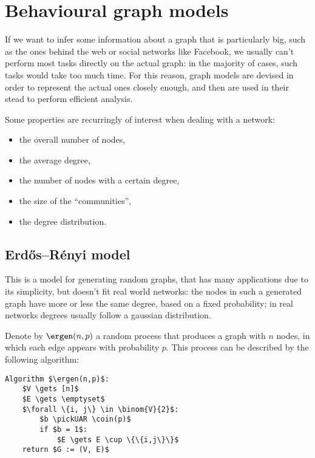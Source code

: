 \chapter{Behavioural graph models}\label{sec:users-behaviors}

If we want to infer some information about a graph that is particularly big, such as the ones behind the web or social networks like Facebook, we usually can't perform most tasks directly on the actual graph: in the majority of cases, such tasks would take too much time. For this reason, graph models are devised in order to represent the actual ones closely enough, and then are used in their stead to perform efficient analysis.

Some properties are recurringly of interest when dealing with a network:
\begin{itemize}
    \item the overall number of nodes,
    \item the average degree,
    \item the number of nodes with a certain degree,
    \item the size of the ``communities'',
    \item the degree distribution.
\end{itemize}

\section{Erd\H{o}s–Rényi model}\label{sec:gnp}
    
This is a model for generating random graphs, that has many applications due to its simplicity, but doesn't fit real world networks: the nodes in such a generated graph have more or less the same degree, based on a fixed probability; in real networks degrees usually follow a gaussian distribution.

Denote by $\ergen(n, p)$ a random process that produces a graph with $n$ nodes, in which each edge appears with probability $p$. This process can be described by the following algorithm:

\begin{lstlisting}[caption = {The $\ergen(n,p)$ algorithm}, label = {lst:gnp}]
Algorithm $\ergen(n,p)$:
    $V \gets [n]$
    $E \gets \emptyset$
    $\forall \{i, j\} \in \binom{V}{2}$:
        $b \pickUAR \coin(p)$
        if $b = 1$:
            $E \gets E \cup \{\{i,j\}\}$
    return $G := (V, E)$
\end{lstlisting}

